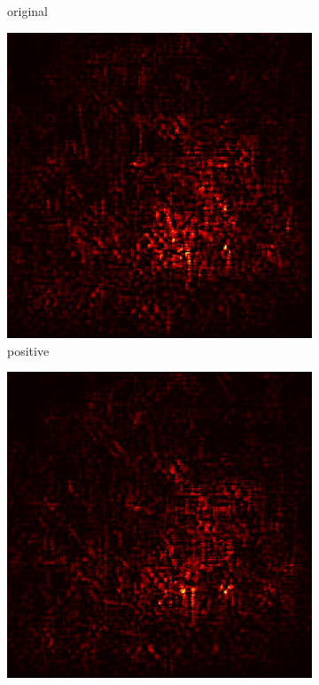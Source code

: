\documentclass[preprint,12pt]{elsarticle}
\begin{document}
\begin{figure}
\begin{subfigure}{0.14\linewidth}
        \caption{original}
    \end{subfigure}
    \hfill
    \begin{subfigure}{0.14\textwidth}
        \centering
        \includegraphics[width=\linewidth]{../visualizations/examples/imagenette/resnet18/positive_saliency_map/1.png}
        \caption{positive}
    \end{subfigure}
    \hfill
    \begin{subfigure}{0.14\textwidth}
        \centering
        \includegraphics[width=\linewidth]{../visualizations/examples/imagenette/resnet18/negative_saliency_map/1.png}

\end{subfigure}
\end{figure}
\end{document}
